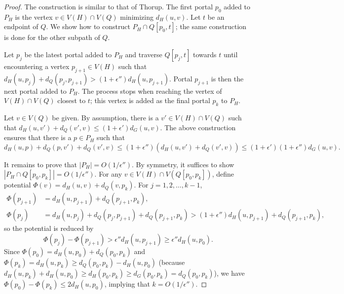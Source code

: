 \documentclass[11pt]{article}
\begin{document}
\begin{proof}
The construction is similar to that of Thorup. The first portal $p_0$ added to $P_H$ is the vertex $v\in V(H)\cap V(Q)$ minimizing $d_H(u,v)$. Let $t$ be an endpoint of $Q$. We show how to construct $P_H\cap Q[p_0,t]$; the same construction is done for the other subpath of $Q$.

Let $p_j$ be the latest portal added to $P_H$ and traverse $Q[p_j,t]$ towards $t$ until encountering a vertex $p_{j+1}\in V(H)$ such that $d_H(u,p_j) + d_Q(p_j,p_{j+1}) > (1+\epsilon'')d_H(u,p_{j+1})$. Portal $p_{j+1}$ is then the next portal added to $P_H$. The process stops when reaching the vertex of $V(H)\cap V(Q)$ closest to $t$; this vertex is added as the final portal $p_k$ to $P_H$.

Let $v\in V(Q)$ be given. By assumption, there is a $v'\in V(H)\cap V(Q)$ such that $d_H(u,v') + d_Q(v',v)\leq (1+\epsilon')d_G(u,v)$. The above construction ensures that there is a $p\in P_H$ such that
\[
  d_H(u,p) + d_Q(p,v') + d_Q(v',v) \leq (1+\epsilon'')(d_H(u,v') + d_Q(v',v)) \leq (1+\epsilon')(1+\epsilon'')d_G(u,v).
\]

It remains to prove that $|P_H| = O(1/\epsilon'')$. By symmetry, it suffices to show $|P_H\cap Q[p_0,p_k]| = O(1/\epsilon'')$. For any $v\in V(H)\cap V(Q[p_0,p_k])$, define potential $\Phi(v) = d_H(u,v) + d_Q(v,p_k)$. For $j = 1,2,\ldots,k-1$,
\begin{align*}
\Phi(p_{j+1}) & = d_H(u,p_{j+1}) + d_Q(p_{j+1},p_k),\\
\Phi(p_j)    & = d_H(u,p_j) + d_Q(p_j,p_{j+1}) + d_Q(p_{j+1},p_k) > (1+\epsilon'')d_H(u,p_{j+1}) + d_Q(p_{j+1},p_k),
\end{align*}
so the potential is reduced by
\[
  \Phi(p_j) - \Phi(p_{j+1}) > \epsilon''d_H(u,p_{j+1})\geq \epsilon''d_H(u,p_0).
\]
Since $\Phi(p_0) = d_H(u,p_0) + d_Q(p_0,p_k)$ and $\Phi(p_k) = d_H(u,p_k)\geq d_Q(p_0,p_k) - d_H(u,p_0)$ (because $d_H(u,p_k) + d_H(u,p_0)\geq d_H(p_0,p_k)\geq d_G(p_0,p_k) = d_Q(p_0,p_k)$), we have $\Phi(p_0) - \Phi(p_k)\leq 2d_H(u,p_0)$, implying that $k = O(1/\epsilon'')$.
\end{proof}
\end{document}
